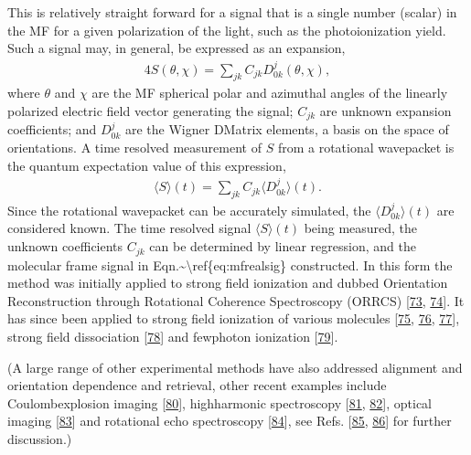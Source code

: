\documentclass[letterpaper,table,10pt,english]{jupyterBook}
\begin{document}
\sphinxAtStartPar
This is relatively straight forward for a signal that is a single number (scalar) in the MF for a given polarization of the light, such as the photoionization yield. Such a signal may, in general, be expressed as an expansion,
\begin{equation}\label{equation:part1/numerics_231122:eq:mfrealsig}
\begin{split}4
S(\theta,\chi)=\sum_{jk}C_{jk}D^{j}_{0k}(\theta,\chi),
\end{split}
\end{equation}
\sphinxAtStartPar
where \(\theta\) and \(\chi\) are the MF spherical polar and azimuthal angles of the linearly polarized electric field vector generating the signal; \(C_{jk}\) are unknown expansion coefficients; and \(D^{j}_{0k}\) are the Wigner D\sphinxhyphen{}Matrix elements, a basis on the space of orientations. A time resolved measurement of \(S\) from a rotational wavepacket is the quantum expectation value of this expression,
\begin{equation}\label{equation:part1/numerics_231122:eq:St-Cjk}
\begin{split}
\langle S \rangle(t) = \sum_{jk}C_{jk}\langle D^{j}_{0k} \rangle (t).
\end{split}
\end{equation}
\sphinxAtStartPar
Since the rotational wavepacket can be accurately simulated, the \(\langle D^{j}_{0k} \rangle (t)\) are considered known. The time resolved signal \(\langle S \rangle(t)\) being measured, the unknown coefficients \(C_{jk}\) can be determined by linear regression, and the molecular frame signal in Eqn.\textasciitilde{}\textbackslash{}ref\{eq:mfrealsig\} constructed. In this form the method was initially applied to strong field ionization and dubbed Orientation Reconstruction through Rotational Coherence Spectroscopy (ORRCS) {[}\hyperlink{cite.backmatter/bibliography:id888}{73}, \hyperlink{cite.backmatter/bibliography:id887}{74}{]}.
It has since been applied to strong field ionization of various molecules {[}\hyperlink{cite.backmatter/bibliography:id889}{75}, \hyperlink{cite.backmatter/bibliography:id890}{76}, \hyperlink{cite.backmatter/bibliography:id893}{77}{]},
strong field dissociation {[}\hyperlink{cite.backmatter/bibliography:id892}{78}{]} and few\sphinxhyphen{}photon ionization {[}\hyperlink{cite.backmatter/bibliography:id891}{79}{]}.

\sphinxAtStartPar
(A large range of other experimental methods have also addressed alignment and orientation dependence and retrieval, other recent examples include Coulomb\sphinxhyphen{}explosion imaging {[}\hyperlink{cite.backmatter/bibliography:id844}{80}{]}, high\sphinxhyphen{}harmonic spectroscopy {[}\hyperlink{cite.backmatter/bibliography:id585}{81}, \hyperlink{cite.backmatter/bibliography:id586}{82}{]}, optical imaging {[}\hyperlink{cite.backmatter/bibliography:id689}{83}{]} and rotational echo spectroscopy {[}\hyperlink{cite.backmatter/bibliography:id855}{84}{]}, see Refs. {[}\hyperlink{cite.backmatter/bibliography:id749}{85}, \hyperlink{cite.backmatter/bibliography:id658}{86}{]} for further discussion.)
\end{document}
